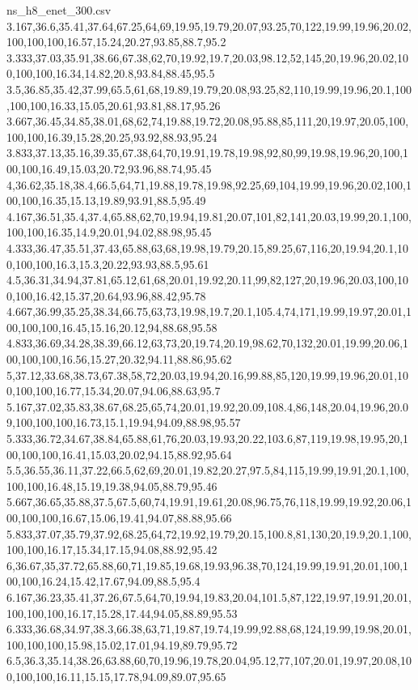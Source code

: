 \begin{filecontents*}[overwrite]{ns_h8_enet_300.csv}
3.167,36.6,35.41,37.64,67.25,64,69,19.95,19.79,20.07,93.25,70,122,19.99,19.96,20.02,100,100,100,16.57,15.24,20.27,93.85,88.7,95.2
3.333,37.03,35.91,38.66,67.38,62,70,19.92,19.7,20.03,98.12,52,145,20,19.96,20.02,100,100,100,16.34,14.82,20.8,93.84,88.45,95.5
3.5,36.85,35.42,37.99,65.5,61,68,19.89,19.79,20.08,93.25,82,110,19.99,19.96,20.1,100,100,100,16.33,15.05,20.61,93.81,88.17,95.26
3.667,36.45,34.85,38.01,68,62,74,19.88,19.72,20.08,95.88,85,111,20,19.97,20.05,100,100,100,16.39,15.28,20.25,93.92,88.93,95.24
3.833,37.13,35.16,39.35,67.38,64,70,19.91,19.78,19.98,92,80,99,19.98,19.96,20,100,100,100,16.49,15.03,20.72,93.96,88.74,95.45
4,36.62,35.18,38.4,66.5,64,71,19.88,19.78,19.98,92.25,69,104,19.99,19.96,20.02,100,100,100,16.35,15.13,19.89,93.91,88.5,95.49
4.167,36.51,35.4,37.4,65.88,62,70,19.94,19.81,20.07,101,82,141,20.03,19.99,20.1,100,100,100,16.35,14.9,20.01,94.02,88.98,95.45
4.333,36.47,35.51,37.43,65.88,63,68,19.98,19.79,20.15,89.25,67,116,20,19.94,20.1,100,100,100,16.3,15.3,20.22,93.93,88.5,95.61
4.5,36.31,34.94,37.81,65.12,61,68,20.01,19.92,20.11,99,82,127,20,19.96,20.03,100,100,100,16.42,15.37,20.64,93.96,88.42,95.78
4.667,36.99,35.25,38.34,66.75,63,73,19.98,19.7,20.1,105.4,74,171,19.99,19.97,20.01,100,100,100,16.45,15.16,20.12,94,88.68,95.58
4.833,36.69,34.28,38.39,66.12,63,73,20,19.74,20.19,98.62,70,132,20.01,19.99,20.06,100,100,100,16.56,15.27,20.32,94.11,88.86,95.62
5,37.12,33.68,38.73,67.38,58,72,20.03,19.94,20.16,99.88,85,120,19.99,19.96,20.01,100,100,100,16.77,15.34,20.07,94.06,88.63,95.7
5.167,37.02,35.83,38.67,68.25,65,74,20.01,19.92,20.09,108.4,86,148,20.04,19.96,20.09,100,100,100,16.73,15.1,19.94,94.09,88.98,95.57
5.333,36.72,34.67,38.84,65.88,61,76,20.03,19.93,20.22,103.6,87,119,19.98,19.95,20,100,100,100,16.41,15.03,20.02,94.15,88.92,95.64
5.5,36.55,36.11,37.22,66.5,62,69,20.01,19.82,20.27,97.5,84,115,19.99,19.91,20.1,100,100,100,16.48,15.19,19.38,94.05,88.79,95.46
5.667,36.65,35.88,37.5,67.5,60,74,19.91,19.61,20.08,96.75,76,118,19.99,19.92,20.06,100,100,100,16.67,15.06,19.41,94.07,88.88,95.66
5.833,37.07,35.79,37.92,68.25,64,72,19.92,19.79,20.15,100.8,81,130,20,19.9,20.1,100,100,100,16.17,15.34,17.15,94.08,88.92,95.42
6,36.67,35,37.72,65.88,60,71,19.85,19.68,19.93,96.38,70,124,19.99,19.91,20.01,100,100,100,16.24,15.42,17.67,94.09,88.5,95.4
6.167,36.23,35.41,37.26,67.5,64,70,19.94,19.83,20.04,101.5,87,122,19.97,19.91,20.01,100,100,100,16.17,15.28,17.44,94.05,88.89,95.53
6.333,36.68,34.97,38.3,66.38,63,71,19.87,19.74,19.99,92.88,68,124,19.99,19.98,20.01,100,100,100,15.98,15.02,17.01,94.19,89.79,95.72
6.5,36.3,35.14,38.26,63.88,60,70,19.96,19.78,20.04,95.12,77,107,20.01,19.97,20.08,100,100,100,16.11,15.15,17.78,94.09,89.07,95.65

\end{filecontents*}
